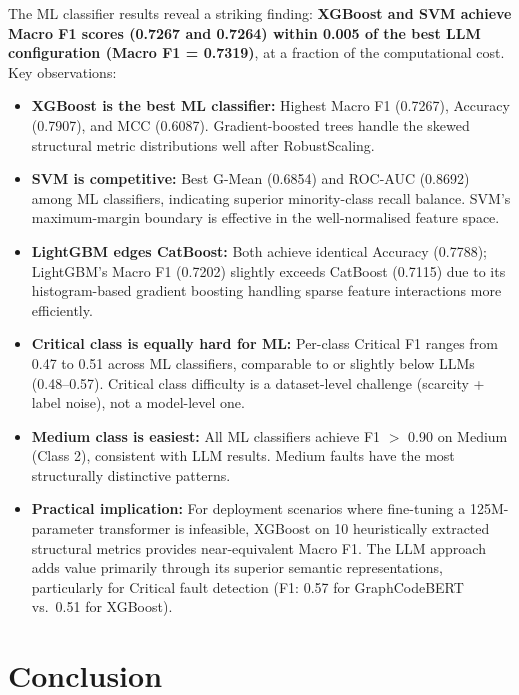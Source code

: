 \documentclass[12pt, a4paper]{report}
\begin{document}
The ML classifier results reveal a striking finding: \textbf{XGBoost and SVM achieve Macro F1 scores (0.7267 and 0.7264) within 0.005 of the best LLM configuration (Macro F1 = 0.7319)}, at a fraction of the computational cost. Key observations:

\begin{itemize}
  \item \textbf{XGBoost is the best ML classifier:} Highest Macro F1 (0.7267), Accuracy (0.7907), and MCC (0.6087). Gradient-boosted trees handle the skewed structural metric distributions well after RobustScaling.
  \item \textbf{SVM is competitive:} Best G-Mean (0.6854) and ROC-AUC (0.8692) among ML classifiers, indicating superior minority-class recall balance. SVM's maximum-margin boundary is effective in the well-normalised feature space.
  \item \textbf{LightGBM edges CatBoost:} Both achieve identical Accuracy (0.7788); LightGBM's Macro F1 (0.7202) slightly exceeds CatBoost (0.7115) due to its histogram-based gradient boosting handling sparse feature interactions more efficiently.
  \item \textbf{Critical class is equally hard for ML:} Per-class Critical F1 ranges from 0.47 to 0.51 across ML classifiers, comparable to or slightly below LLMs (0.48--0.57). Critical class difficulty is a dataset-level challenge (scarcity + label noise), not a model-level one.
  \item \textbf{Medium class is easiest:} All ML classifiers achieve F1 $>$ 0.90 on Medium (Class 2), consistent with LLM results. Medium faults have the most structurally distinctive patterns.
  \item \textbf{Practical implication:} For deployment scenarios where fine-tuning a 125M-parameter transformer is infeasible, XGBoost on 10 heuristically extracted structural metrics provides near-equivalent Macro F1. The LLM approach adds value primarily through its superior semantic representations, particularly for Critical fault detection (F1: 0.57 for GraphCodeBERT vs.\ 0.51 for XGBoost).
\end{itemize}

\clearpage
\chapter{Conclusion}
\end{document}
